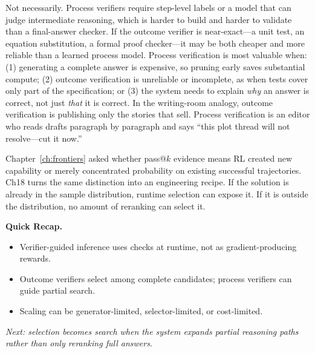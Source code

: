 \begin{tcolorbox}[colback=blue!5, colframe=blue!40, title=\textbf{Is Process Verification Always Better Than Outcome Verification?}]
Not necessarily. Process verifiers require step-level labels or a model that can judge intermediate reasoning, which is harder to build and harder to validate than a final-answer checker. If the outcome verifier is near-exact---a unit test, an equation substitution, a formal proof checker---it may be both cheaper and more reliable than a learned process model. Process verification is most valuable when: (1) generating a complete answer is expensive, so pruning early saves substantial compute; (2) outcome verification is unreliable or incomplete, as when tests cover only part of the specification; or (3) the system needs to explain \emph{why} an answer is correct, not just \emph{that} it is correct. In the writing-room analogy, outcome verification is publishing only the stories that sell. Process verification is an editor who reads drafts paragraph by paragraph and says ``this plot thread will not resolve---cut it now.''
\end{tcolorbox}

\begin{tcolorbox}[colback=gray!8, colframe=gray!40, title=\textbf{Echo: From Ch17 Audit to Ch18 Runtime}]
Chapter~\ref{ch:frontiers} asked whether pass@$k$ evidence means RL created new capability or merely concentrated probability on existing successful trajectories. Ch18 turns the same distinction into an engineering recipe. If the solution is already in the sample distribution, runtime selection can expose it. If it is outside the distribution, no amount of reranking can select it.
\end{tcolorbox}

\begin{quickrecap}
\textbf{Quick Recap.}
\begin{itemize}[nosep,leftmargin=1.5em]
  \item Verifier-guided inference uses checks at runtime, not as gradient-producing rewards.
  \item Outcome verifiers select among complete candidates; process verifiers can guide partial search.
  \item Scaling can be generator-limited, selector-limited, or cost-limited.
\end{itemize}
\textit{Next: selection becomes search when the system expands partial reasoning paths rather than only reranking full answers.}
\end{quickrecap}


